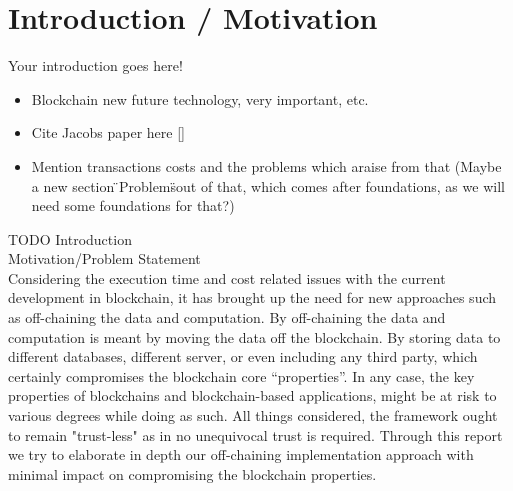 \section{Introduction / Motivation}

Your introduction goes here! 
\begin{itemize}
\item Blockchain new future technology, very important, etc.
\item Cite Jacobs paper here [\cite{Eberhardt2017}]
\item Mention transactions costs and the problems which araise from that (Maybe a new section \"{}Problems\"{}out of that, which comes after foundations, as we will need some foundations for that?)
\end{itemize}

TODO Introduction\\
Motivation/Problem Statement\\
Considering the execution time and cost related issues with the current development in blockchain, it has brought up the need for new approaches such as off-chaining the data and computation. By off-chaining the data and computation is meant by moving the data off the blockchain. By storing data to different databases, different server, or even including any third party, which certainly compromises the blockchain core “properties”. In any case, the key properties of blockchains and blockchain-based applications, might be at risk to various degrees while doing as such. All things considered, the framework ought to remain "trust-less" as in no unequivocal trust is required. Through this report we try to elaborate in depth our off-chaining implementation approach with minimal impact on compromising the blockchain properties.
